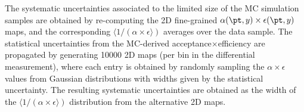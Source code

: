 The systematic uncertainties associated to the limited size of the MC simulation samples are obtained by re-computing the 2D fine-grained $\alpha(\pt,y) \times \epsilon(\pt,y)$ maps, and the corresponding $\langle 1 / (\alpha\!\times\!\epsilon\rangle)$ averages over the data sample.
The statistical uncertainties from the MC-derived acceptance$\times$efficiency
are propagated by generating 10000 2D maps (per bin in the differential measurement), where each entry is obtained by randomly sampling 
the $\alpha\!\times\!\epsilon$ values from Gaussian distributions with widths given by the statistical uncertainty. The resulting systematic
uncertainties are obtained as the width of the $\langle 1 /(\alpha\!\times\!\epsilon\rangle)$ distribution from the alternative 2D maps. 



